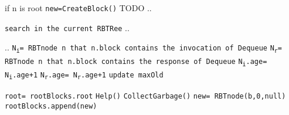 \documentclass[10pt]{article}
\newcommand\keywordfont{\sffamily\bfseries}
\theoremstyle{definition}
\begin{document}
\begin{algorithm}
\begin{algorithmic}[1]
\begin{multicols}{2}
\begin{itemize}
\end{itemize}


\Statex



 \Comment if n is root
\State \texttt{new=CreateBlock()} \Comment TODO
 
\Statex..\EndIf
{}

\Statex

 
\If{\texttt{n {\keywordfont is} root}} \Return \texttt{search in the current RBTRee}
\Else
..
\EndIf
{}

\Statex

\State ..
\State \texttt{N\textsubscript{i}= RBTnode n that n.block contains the invocation of Dequeue}
\State \texttt{N\textsubscript{r}= RBTnode n that n.block contains the response of Dequeue}
\State \texttt{N\textsubscript{i}.age= N\textsubscript{i}.age+1} 
\State \texttt{N\textsubscript{r}.age= N\textsubscript{r}.age+1}
 \texttt{update maxOld}
\EndIf
{}


\pagebreak

 
\State \texttt{root= rootBlocks.root}
\State \texttt{Help()}
\State \texttt{CollectGarbage()}
\EndIf
\State \texttt{new= RBTnode(b,0,null)}
\State \Return \texttt{rootBlocks.append(new)}
\Statex



\end{multicols}
\end{algorithmic}
\end{algorithm}
\end{document}
